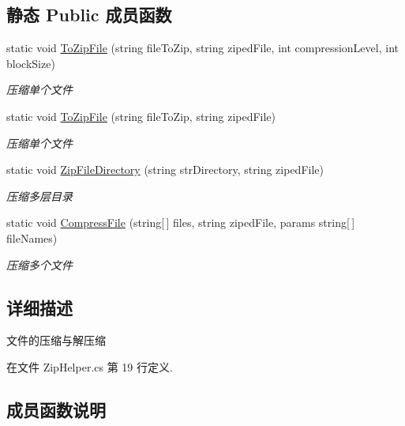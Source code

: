 \subsection*{静态 Public 成员函数}
\begin{DoxyCompactItemize}
\item 
static void \hyperlink{class_x_c_l_net_tools_1_1_file_handler_1_1_zip_helper_a4437b013f4b0db430cb1fd6097ed54a1}{To\+Zip\+File} (string file\+To\+Zip, string ziped\+File, int compression\+Level, int block\+Size)
\begin{DoxyCompactList}\small\item\em 压缩单个文件 \end{DoxyCompactList}\item 
static void \hyperlink{class_x_c_l_net_tools_1_1_file_handler_1_1_zip_helper_ab59c063455118d1eedb3a1af719db063}{To\+Zip\+File} (string file\+To\+Zip, string ziped\+File)
\begin{DoxyCompactList}\small\item\em 压缩单个文件 \end{DoxyCompactList}\item 
static void \hyperlink{class_x_c_l_net_tools_1_1_file_handler_1_1_zip_helper_a1231101acec5d274c2770115d1584ae3}{Zip\+File\+Directory} (string str\+Directory, string ziped\+File)
\begin{DoxyCompactList}\small\item\em 压缩多层目录 \end{DoxyCompactList}\item 
static void \hyperlink{class_x_c_l_net_tools_1_1_file_handler_1_1_zip_helper_abd0e8402a3d1ea9ca9f6c97cb46d5b89}{Compress\+File} (string\mbox{[}$\,$\mbox{]} files, string ziped\+File, params string\mbox{[}$\,$\mbox{]} file\+Names)
\begin{DoxyCompactList}\small\item\em 压缩多个文件 \end{DoxyCompactList}\end{DoxyCompactItemize}


\subsection{详细描述}
文件的压缩与解压缩 



在文件 Zip\+Helper.\+cs 第 19 行定义.



\subsection{成员函数说明}
\mbox{\label{class_x_c_l_net_tools_1_1_file_handler_1_1_zip_helper_abd0e8402a3d1ea9ca9f6c97cb46d5b89}} 

